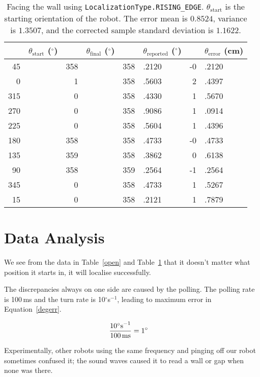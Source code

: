 \documentclass[twocolumn]{article}
\def\degree{\ensuremath{^\circ}}
\begin{document}
\begin{table*}[htb]
\begin{center}\begin{tabular}{r@{}l r@{}l r@{}l r@{}l}
&$\theta_{\text{start}}$ (\degree)& &$\theta_{\text{final}}$ (\degree)& &$\theta_{\text{reported}}$ (\degree)& &$\theta_{\text{error}}$ (cm) \\
\hline
45&& 358&& 358&.2120& -0&.2120 \\
0&& 1&& 358&.5603& 2&.4397 \\
315&& 0&& 358&.4330& 1&.5670 \\
270&& 0&& 358&.9086& 1&.0914 \\
225&& 0&& 358&.5604& 1&.4396 \\
180&& 358&& 358&.4733& -0&.4733 \\
135&& 359&& 358&.3862& 0&.6138 \\
90&& 358&& 359&.2564& -1&.2564 \\
345&& 0&& 358&.4733& 1&.5267 \\
15&& 0&& 358&.2121& 1&.7879 \\
\end{tabular}\end{center}
\caption{Facing the wall using {\tt LocalizationType.RISING\_EDGE}.
$\theta_{\text{start}}$ is the starting orientation of the robot.
The error mean is $0.8524$, variance is $1.3507$, and the corrected sample standard deviation is $1.1622$.}
\label{wall}
\end{table*}

\section{Data Analysis}

We see from the data in Table~\ref{open} and Table~\ref{wall} that it doesn't matter what position it starts in, it will localise successfully.

The discrepancies always on one side are caused by the polling. The polling rate is 100\,ms and the turn rate is 10\degree s$^{-1}$, leading to maximum error in Equation~\ref{degerr}.

\begin{align}
\frac{10\text{\degree s}^{-1}}{100\text{\,ms}} &= 1\degree\label{degerr}
\end{align}

Experimentally, other robots using the same frequency and pinging off our robot sometimes confused it; the sound waves caused it to read a wall or gap when none was there.
\end{document}
